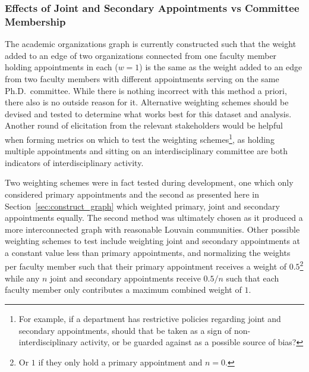 \documentclass[notitlepage,aps,prd,nofootinbib]{revtex4-1}
\begin{document}
\subsubsection{Effects of Joint and Secondary Appointments vs Committee Membership}
The academic organizations graph is currently constructed such that the weight added to an edge of two organizations connected from one faculty member holding appointments in each ($w=1$) is the same as the weight added to an edge from two faculty members with different appointments serving on the same Ph.D.\ committee. While there is nothing incorrect with this method a priori, there also is no outside reason for it. Alternative weighting schemes should be devised and tested to determine what works best for this dataset and analysis. Another round of elicitation from the relevant stakeholders would be helpful when forming metrics on which to test the weighting schemes\footnote{For example, if a department has restrictive policies regarding joint and secondary appointments, should that be taken as a sign of non-interdisciplinary activity, or be guarded against as a possible source of bias?}, as holding multiple appointments and sitting on an interdisciplinary committee are both indicators of interdisciplinary activity.

Two weighting schemes were in fact tested during development, one which only considered primary appointments and the second as presented here in Section~\ref{sec:construct_graph} which weighted primary, joint and secondary appointments equally. The second method was ultimately chosen as it produced a more interconnected graph with reasonable Louvain communities. Other possible weighting schemes to test include weighting joint and secondary appointments at a constant value less than primary appointments, and normalizing the weights per faculty member such that their primary appointment receives a weight of $0.5$\footnote{Or $1$ if they only hold a primary appointment and $n=0$.} while any $n$ joint and secondary appointments receive $0.5 / n$ such that each faculty member only contributes a maximum combined weight of $1$.
\end{document}
